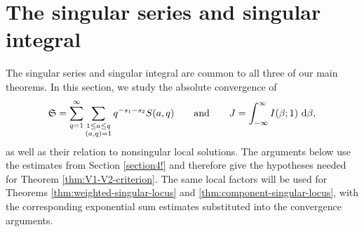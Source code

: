 \documentclass[12pt,reqno]{amsart}
\theoremstyle{definition}
\theoremstyle{remark}
\numberwithin{equation}{section}
\def\grS{{\mathfrak S}}\def\grP{{\mathfrak P}}
\def\b{{\beta}}  \def\bfbet{{\boldsymbol \beta}}
\def\d{{\,{\rm d}}}
\begin{document}
\section{The singular series and singular integral}\label{sec:major arcs}
The singular series and singular integral are common to all three of our main
theorems. In this section, we study the absolute convergence of
\[
    \grS=\sum_{q=1}^{\infty}
    \sum_{\substack{1\leq a\leq q\\(a,q)=1}}
    q^{-s_1-s_2}S(a,q)
    \qquad\text{and}\qquad
    J=\int_{-\infty}^{\infty}I(\b;1)\,\d\b,
\]
as well as their relation to nonsingular local solutions. The arguments below
use the estimates from Section \ref{section4!} and therefore give the hypotheses needed
for Theorem \ref{thm:V1-V2-criterion}. The same local factors will be used
for Theorems \ref{thm:weighted-singular-locus} and
\ref{thm:component-singular-locus}, with the corresponding exponential
sum estimates substituted into the convergence arguments.
\end{document}
